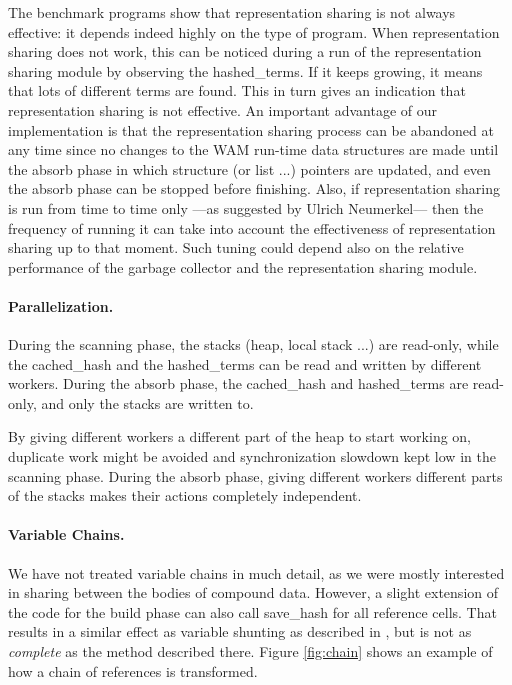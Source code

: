 \documentclass{tlp}
\begin{document}
The benchmark programs show that representation sharing is not always
effective: it depends indeed highly on the type of program. When
representation sharing does not work, this can be noticed during a run
of the representation sharing module by observing the hashed\_terms. If it
keeps growing, it means that lots of different terms are found. This
in turn gives an indication that representation sharing is not
effective. An important advantage of our implementation is that the
representation sharing process can be abandoned at any time since no
changes to the WAM run-time data structures are made until the absorb
phase in which structure (or list ...) pointers are
updated, and even the absorb phase can be stopped before
finishing. Also, if representation sharing is run from time to time
only ---as suggested by Ulrich Neumerkel--- then the frequency of
running it can take into account the effectiveness of representation
sharing up to that moment. Such tuning could depend also on the
relative performance of the garbage collector and the representation
sharing module.

\paragraph{\bf Parallelization.}

During the scanning phase, the stacks (heap, local stack ...) are
read-only, while the cached\_hash and the hashed\_terms can be read
and written by different workers.
During the absorb phase, the cached\_hash and
hashed\_terms are read-only, and only the stacks are written to.

By giving different workers a different part of the heap to start
working on, duplicate work might be avoided and synchronization
slowdown kept low in the scanning phase. During the absorb phase,
giving different workers different parts of the stacks makes their
actions completely independent.


\paragraph{\bf Variable Chains.}

We have not treated variable chains in much detail, as we were mostly
interested in sharing between the bodies of compound data. However, a
slight extension of the code for the build phase can also call
save\_hash for all reference cells. That results in a similar effect
as variable shunting as described in \cite{VariableShunting}, but is
not as {\em complete} as the method described there. Figure
\ref{fig:chain} shows an example of how a chain of references is
transformed.
\end{document}
